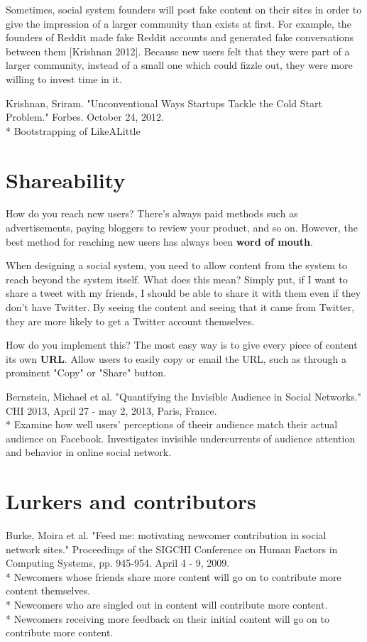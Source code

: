 \documentclass[class=book, crop=false]{standalone}
\providecommand{\keyterm}[1]{\textbf{#1}\marginnote{\scriptsize \textbf{#1}}}
\begin{document}
Sometimes, social system founders will post fake content on their sites in order to give the impression of a larger community than exists at first. For example, the founders of Reddit made fake Reddit accounts and generated fake conversations between them [Krishnan 2012]. Because new users felt that they were part of a larger community, instead of a small one which could fizzle out, they were more willing to invest time in it.

Krishnan, Sriram. "Unconventional Ways Startups Tackle the Cold Start Problem." Forbes. October 24, 2012.\\
 * Bootstrapping of LikeALittle

\section{Shareability}
How do you reach new users? There's always paid methods such as advertisements, paying bloggers to review your product, and so on. However, the best method for reaching new users has always been \keyterm{word of mouth}.

When designing a social system, you need to allow content from the system to reach beyond the system itself. What does this mean? Simply put, if I want to share a tweet with my friends, I should be able to share it with them even if they don't have Twitter. By seeing the content and seeing that it came from Twitter, they are more likely to get a Twitter account themselves.

How do you implement this? The most easy way is to give every piece of content its own \keyterm{URL}. Allow users to easily copy or email the URL, such as through a prominent "Copy" or "Share" button.

Bernstein, Michael et al. "Quantifying the Invisible Audience in Social Networks." CHI 2013, April 27 - may 2, 2013, Paris, France.\\
 * Examine how well users' perceptions of theeir audience match their actual audience on Facebook. Investigates invisible undercurrents of audience attention and behavior in online social network.

\section{Lurkers and contributors}

Burke, Moira et al. "Feed me: motivating newcomer contribution in social network sites." Proceedings of the SIGCHI Conference on Human Factors in Computing Systems, pp. 945-954. April 4 - 9, 2009.\\
 * Newcomers whose friends share more content will go on to contribute more content themselves.\\
 * Newcomers who are singled out in content will contribute more content.\\
 * Newcomers receiving more feedback on their initial content will go on to contribute more content.
\end{document}
